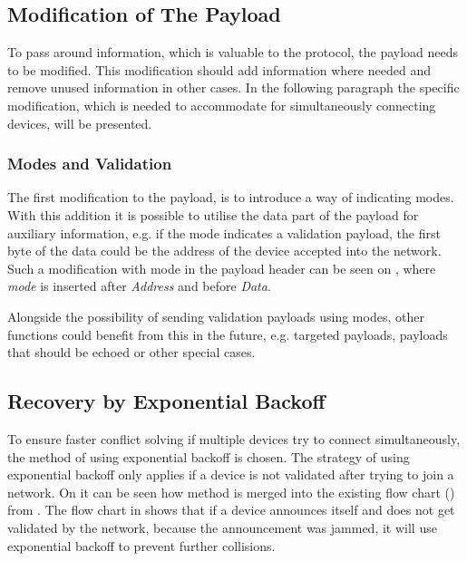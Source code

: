 \subsection{Modification of The Payload} %
\label{sub:modification_of_the_payload}
To pass around information, which is valuable to the protocol, the payload needs to be modified.
This modification should add information where needed and remove unused information in other cases.
In the following paragraph the specific modification, which is needed to accommodate for simultaneously connecting devices, will be presented. 

\subsubsection{Modes and Validation} %
\label{ssub:modes_and_validation}
The first modification to the payload, is to introduce a way of indicating modes.
With this addition it is possible to utilise the data part of the payload for auxiliary information, e.g. if the mode indicates a validation payload, the first byte of the data could be the address of the device accepted into the network.
Such a modification with mode in the payload header can be seen on , where \emph{mode} is inserted after \emph{Address} and before \emph{Data}. 


\noindent
Alongside the possibility of sending validation payloads using modes, other functions could benefit from this in the future, e.g. targeted payloads, payloads that should be echoed or other special cases.


\subsection{Recovery by Exponential Backoff} %
\label{sub:introduction_of_sub_slots_and_exponential_backoff}
To ensure faster conflict solving if multiple devices try to connect simultaneously, the method of using exponential backoff is chosen.
The strategy of using exponential backoff only applies if a device is not validated after trying to join a network.
On  it can be seen how method is merged into the existing flow chart () from .
The flow chart in  shows that if a device announces itself and does not get validated by the network, because the announcement was jammed, it will use exponential backoff to prevent further collisions.  

